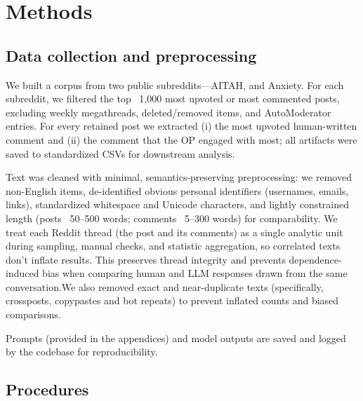 
\section{Methods} \label{sec:Methods}
\textcolor{black!30}{\lipsum[11-12]}

\subsection{Data collection and preprocessing}
We built a corpus from two public subreddits—AITAH, and Anxiety. For each subreddit, we filtered the top ~1,000 most upvoted or most commented posts, excluding weekly megathreads, deleted/removed items, and AutoModerator entries. For every retained post we extracted (i) the most upvoted human-written comment and (ii) the comment that the OP engaged with most; all artifacts were saved to standardized CSVs for downstream analysis.

Text was cleaned with minimal, semantics-preserving preprocessing: we removed non-English items, de-identified obvious personal identifiers (usernames, emails, links), standardized whitespace and Unicode characters, and lightly constrained length (posts ~50–500 words; comments ~5–300 words) for comparability. We treat each Reddit thread (the post and its comments) as a single analytic unit during sampling, manual checks, and statistic aggregation, so correlated texts don’t inflate results. This preserves thread integrity and prevents dependence-induced bias when comparing human and LLM responses drawn from the same conversation.We also removed exact and near-duplicate texts (specifically, crossposts, copypastes and bot repeats) to prevent inflated counts and biased comparisons. 

\smallskip Prompts (provided in the appendices) and model outputs are saved and logged by the codebase for reproducibility.

\subsection{Procedures}
\textcolor{black!30}{\lipsum[14-15]}
